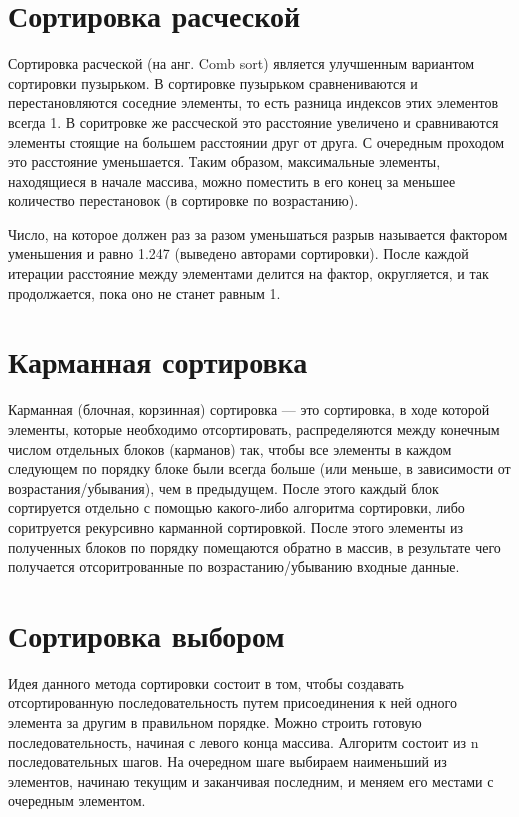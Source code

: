 \documentclass[12pt]{report}
\begin{document}
	
	\section{Сортировка расческой}
	
	 Сортировка расческой (на анг. Comb sort) является улучшенным вариантом сортировки пузырьком. В сортировке пузырьком сравнениваются и перестановляются соседние элементы, то есть разница индексов этих элементов всегда 1. В соритровке же рассческой это расстояние увеличено и сравниваются элементы стоящие на большем расстоянии друг от друга. С очередным проходом это расстояние уменьшается. Таким образом, максимальные элементы, находящиеся в начале массива, можно поместить в его конец за меньшее количество перестановок (в сортировке по возрастанию). 
	 
	 Число, на которое должен раз за разом уменьшаться разрыв называется фактором уменьшения и равно 1.247 (выведено авторами сортировки). После каждой итерации расстояние между элементами делится на фактор, округляется, и так продолжается, пока оно не станет равным 1.
	
	\section{Карманная сортировка}
	
	Карманная (блочная, корзинная) сортировка  — это сортировка, в ходе которой элементы, которые необходимо отсортировать, распределяются между конечным числом отдельных блоков (карманов) так, чтобы все элементы в каждом следующем по порядку блоке были всегда больше (или меньше, в зависимости от возрастания/убывания), чем в предыдущем. После этого каждый блок сортируется отдельно с помощью какого-либо алгоритма сортировки, либо соритруется рекурсивно карманной сортировкой. После этого элементы из полученных блоков по порядку помещаются обратно в массив, в результате чего получается отсоритрованные по возрастанию/убыванию входные данные.

	
	\section{Сортировка выбором}
	
	Идея данного метода сортировки состоит в том, чтобы создавать отсортированную последовательность путем присоединения к ней одного элемента за другим в правильном порядке. Можно строить готовую последовательность, начиная с левого конца массива. Алгоритм состоит из n последовательных шагов. На очередном шаге выбираем наименьший из элементов, начинаю текущим и заканчивая последним, и меняем его местами с очередным элементом.
	
\end{document}
